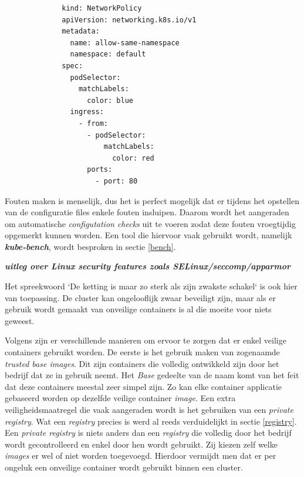 \begin{figure}[h!] \label{netpolicy}
    \begin{verbatim}
        kind: NetworkPolicy
        apiVersion: networking.k8s.io/v1
        metadata:
          name: allow-same-namespace
          namespace: default
        spec:
          podSelector:
            matchLabels:
              color: blue
          ingress:
            - from:
              - podSelector:
                  matchLabels:
                    color: red
              ports:
                - port: 80
    \end{verbatim}
\end{figure}

Fouten maken is menselijk, dus het is perfect mogelijk dat er tijdens het opstellen van de configuratie files enkele fouten insluipen. Daarom wordt het aangeraden om automatische \textit{configutation checks} uit te voeren zodat deze fouten vroegtijdig opgemerkt kunnen worden. Een tool die hiervoor vaak gebruikt wordt, namelijk \textbf{\textit{kube-bench}}, wordt besproken in sectie \ref{bench}.

\textbf{\textit{uitleg over Linux security features zoals SELinux/seccomp/apparmor}}

Het spreekwoord `De ketting is maar zo sterk als zijn zwakste schakel` is ook hier van toepassing. De cluster kan ongelooflijk zwaar beveiligt zijn, maar als er gebruik wordt gemaakt van onveilige containers is al die moeite voor niets geweest.

Volgens \textcite{Lewis2019} zijn er verschillende manieren om ervoor te zorgen dat er enkel veilige containers gebruikt worden. De eerste is het gebruik maken van zogenaamde \textit{trusted base images}. Dit zijn containers die volledig ontwikkeld zijn door het bedrijf dat ze in gebruik neemt. Het \textit{Base} gedeelte van de naam komt van het feit dat deze containers meestal zeer simpel zijn. Zo kan elke container applicatie gebaseerd worden op dezelfde veilige container \textit{image}.
Een extra veiligheidsmaatregel die vaak aangeraden wordt is het gebruiken van een \textit{private registry}. Wat een \textit{registry} precies is werd al reeds verduidelijkt in sectie \ref{registry}. Een \textit{private registry} is niets anders dan een \textit{registry} die volledig door het bedrijf wordt gecontrolleerd en enkel door hen wordt gebruikt. Zij kiezen zelf welke \textit{images} er wel of niet worden toegevoegd. Hierdoor vermijdt men dat er per ongeluk een onveilige container wordt gebruikt binnen een cluster.

